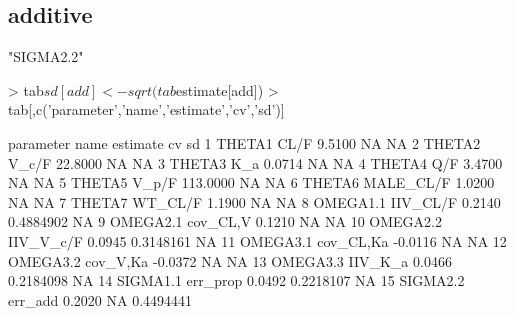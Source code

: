 \subsection{additive}
\begin{Schunk}
\begin{Soutput}
[1] "SIGMA2.2"
\end{Soutput}
\begin{Sinput}
> tab$sd[add] <- sqrt(tab$estimate[add])
> tab[,c('parameter','name','estimate','cv','sd')]
\end{Sinput}
\begin{Soutput}
   parameter      name estimate        cv        sd
1     THETA1      CL/F   9.5100        NA        NA
2     THETA2     V_c/F  22.8000        NA        NA
3     THETA3       K_a   0.0714        NA        NA
4     THETA4       Q/F   3.4700        NA        NA
5     THETA5     V_p/F 113.0000        NA        NA
6     THETA6 MALE_CL/F   1.0200        NA        NA
7     THETA7   WT_CL/F   1.1900        NA        NA
8   OMEGA1.1  IIV_CL/F   0.2140 0.4884902        NA
9   OMEGA2.1  cov_CL,V   0.1210        NA        NA
10  OMEGA2.2 IIV_V_c/F   0.0945 0.3148161        NA
11  OMEGA3.1 cov_CL,Ka  -0.0116        NA        NA
12  OMEGA3.2  cov_V,Ka  -0.0372        NA        NA
13  OMEGA3.3   IIV_K_a   0.0466 0.2184098        NA
14  SIGMA1.1  err_prop   0.0492 0.2218107        NA
15  SIGMA2.2   err_add   0.2020        NA 0.4494441
\end{Soutput}
\end{Schunk}
